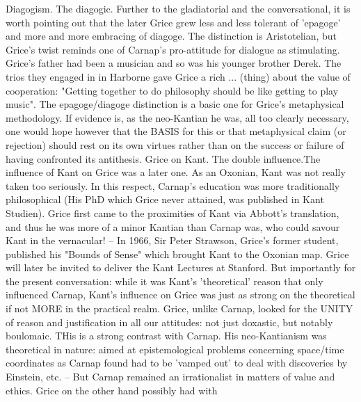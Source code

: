 \documentclass[10pt,titlepage]{book}
\begin{document}
{Diagogism. The  diagogic. Further to the gladiatorial and the 
conversational, it is  worth  pointing out that the later Grice grew less and less 
tolerant of 'epagoge'   and more and more embracing of diagoge. The distinction is 
Aristotelian,  but  Grice's twist reminds one of Carnap's pro-attitude for 
dialogue  as   stimulating. Grice's  father had been a musician and so was 
his younger brother Derek.  The trios  they engaged in in Harborne gave Grice 
a rich ... (thing) about the value of  cooperation: "Getting together to do 
philosophy should be like getting  to  play music". The epagoge/diagoge 
distinction is a basic one for Grice's  metaphysical  methodology. If evidence 
is, as the neo-Kantian he was, all  too clearly  
necessary, one would hope however that the BASIS for this  or that 
metaphysical  claim (or rejection) should rest on its own virtues  rather than on 
the success  or failure of having confronted its  antithesis. 
Grice  on Kant. The  double influence.The influence of Kant on Grice was a 
later one. As an Oxonian,  Kant was not really taken too seriously. In this 
respect, Carnap's education was  more traditionally philosophical (His PhD 
which Grice never attained, was  published in Kant Studien). Grice first came 
to the proximities of Kant via  Abbott's translation, and thus he was more 
of a minor Kantian than Carnap was,  who could savour Kant in the 
vernacular! -- In 1966, Sir Peter Strawson, Grice's  former student, published his 
"Bounds of Sense" which brought Kant to the  Oxonian map. Grice will later be 
invited to deliver the Kant Lectures at  Stanford. But  importantly for the 
present conversation: while it was Kant's 'theoretical'  reason that only 
influenced Carnap, Kant's influence on Grice was just as strong  on the 
theoretical if not MORE in the practical realm. Grice, unlike  Carnap, looked for 
the UNITY of reason and justification in all  our attitudes: not just 
doxastic, but notably boulomaic. THis is a strong  contrast with Carnap. His 
neo-Kantianism was theoretical in nature: aimed at  epistemological problems 
concerning space/time coordinates as Carnap  found had to be 'vamped out' to deal 
with discoveries by Einstein, etc.  -- But Carnap remained an irrationalist 
in matters of value and  ethics. Grice on the other hand possibly had with 
}
\end{document}
